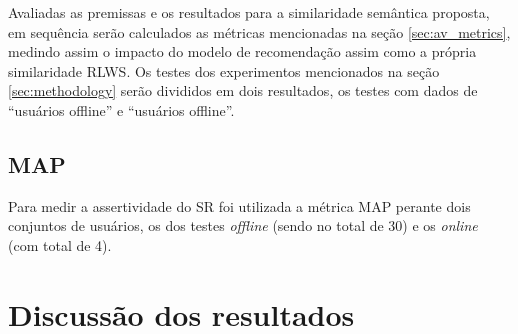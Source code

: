 Avaliadas as premissas e os resultados para a similaridade semântica proposta, em sequência serão calculados as métricas mencionadas na seção \ref{sec:av_metrics}, medindo assim o impacto do modelo de recomendação assim como a própria similaridade \ac{RLWS}. Os testes dos experimentos mencionados na seção \ref{sec:methodology} serão divididos em dois resultados, os testes com dados de \enquote{usuários offline} e \enquote{usuários offline}.

\subsection{MAP}

Para medir a assertividade do \ac{SR} foi utilizada a métrica \ac{MAP} perante dois conjuntos de usuários, os dos testes \textit{offline} (sendo no total de 30) e os \textit{online} (com total de 4). 

\section{Discussão dos resultados}
